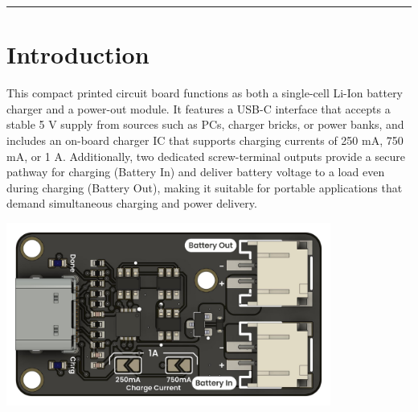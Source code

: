 \documentclass[10pt]{article}
\title{}
\author{}
\date{}
\begin{document}
\noindent
{}
\vspace{1em}
\hrule
\vspace{1.5em}

\section*{Introduction}
\vspace{0.5em}
\noindent
\begin{minipage}[t]{0.62\textwidth}
\setlength{\parskip}{0.75em}
\justifying
This compact printed circuit board functions as both a single-cell Li-Ion battery charger and a power-out module. It features a USB-C interface that accepts a stable 5 V supply from sources such as PCs, charger bricks, or power banks, and includes an on-board charger IC that supports charging currents of 250 mA, 750 mA, or 1 A. Additionally, two dedicated screw-terminal outputs provide a secure pathway for charging (Battery In) and deliver battery voltage to a load even during charging (Battery Out), making it suitable for portable applications that demand simultaneous charging and power delivery.
\end{minipage}
\hfill
\begin{minipage}[t]{0.35\textwidth}
\centering
\vspace{-0.5em}
\includegraphics[height=6.0cm,keepaspectratio]{./images/product.jpg}
\end{minipage}
\end{document}
